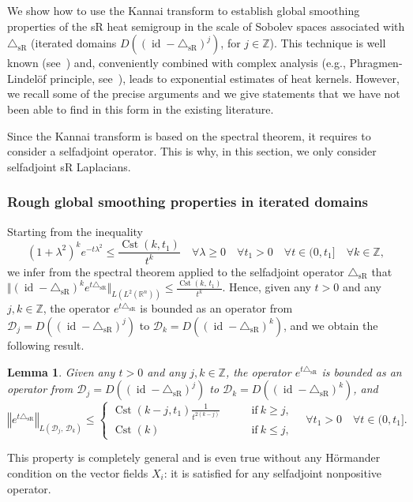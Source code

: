 \documentclass[10pt]{amsart}
\newtheorem{lemm}[theo]{Lemma}\newtheorem{prop}[theo]{Proposition}\newtheorem{coro}[theo]{Corollary}\newtheorem{conj}[theo]{Conjecture}
\theoremstyle{definition}\newtheorem{defi}[theo]{Definition}\newtheorem{rema}[theo]{Remark}\newtheorem{exam}[theo]{Example}\newtheorem{exem}[theo]{Example}\newtheorem{nota}[theo]{Notation}
\newcommand*\R{\mathbb{R}}
\newcommand*\Z{\mathbb{Z}}
\newcommand{\calD}{\mathcal{D}}
\DeclareMathOperator{\Cst}{Cst}
\DeclareMathOperator{\id}{id}
\newcommand{\trianglesR}{\triangle_{\mathrm{sR}}}
\renewcommand{\geq}{\geqslant}
\renewcommand{\leq}{\leqslant}
\let\oldforall\forall
\renewcommand*{\forall}{\mathrel{\oldforall}}
\begin{document}
We show how to use the Kannai transform to establish global smoothing properties of the sR heat semigroup in the scale of Sobolev spaces associated with $\trianglesR$ (iterated domains $D((\id-\trianglesR)^j)$, for $j\in\Z$). This technique is well known (see~\cite{CheegerGromovTaylor_1982}) and, conveniently combined with complex analysis (e.g., Phragmen-Lindel\"of principle, see~\cite{CoulhonSikora_PLMS2008}), leads to exponential estimates of heat kernels. However, we recall some of the precise arguments and we give statements that we have not been able to find in this form in the existing literature.

Since the Kannai transform is based on the spectral theorem, it requires to consider a selfadjoint operator. This is why, in this section, we only consider selfadjoint sR Laplacians.

\subsubsection{Rough global smoothing properties in iterated domains}
Starting from the inequality
\[
\left(1+\lambda^2\right)^k e^{-t\lambda^2} \leq \frac{\Cst(k,t_1)}{t^k} \quad\forall \lambda\geq 0\quad \forall t_1>0\quad \forall t\in(0,t_1] \quad \forall k\in\Z,
\]
we infer from the spectral theorem applied to the selfadjoint operator $\trianglesR$ that $\Vert (\id-\trianglesR)^k e^{t\trianglesR}\Vert_{L(L^2(\R^n))} \leq \frac{\Cst(k,\,t_1)}{t^k}$. Hence, given any $t>0$ and any $j,k\in\Z$, the operator $e^{t\trianglesR}$ is bounded as an operator from $\calD_j=D((\id-\trianglesR)^{j})$ to $\calD_k=D((\id-\trianglesR)^{k})$, and we obtain the following result.

\begin{lemm}
Given any $t>0$ and any $j,k\in\Z$, the operator $e^{t\trianglesR}$ is bounded as an operator from $\calD_j=D((\id-\trianglesR)^{j})$ to $\calD_k=D((\id-\trianglesR)^{k})$, and
\[
\left\Vert e^{t\trianglesR} \right\Vert_{L\left(\calD_j,\,\calD_k\right)} \leq
\begin{cases}
\Cst(k-j,t_1)\frac{1}{t^{2(k-j)}} \qquad & \text{if}\ k\geq j, \\[2mm]
\Cst(k) \quad & \text{if}\ k\leq j,
\end{cases}
\quad \forall t_1>0\quad\forall t\in(0,t_1].
\]
\end{lemm}

This property is completely general and is even true without any H\"ormander condition on the vector fields $X_i$: it is satisfied for any selfadjoint nonpositive operator.
\end{document}
